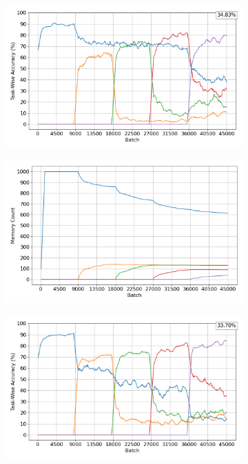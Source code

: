 \documentclass[oneside]{ctuthesis}
\begin{document}
\begin{figure}[t]
    \centering
    \begin{subfigure}[t]{0.48\linewidth}
        \centering
        \includegraphics[width=\linewidth]{figures/DISJOINT2_GSS1k_B1_accuracy.png}
        \label{fig:gss-cifar10-accuracy}
    \end{subfigure}
    \hfill
    \begin{subfigure}[t]{0.48\linewidth}
        \centering
        \includegraphics[width=\linewidth]{figures/DISJOINT2_GSS1k_B1_memory.png}
        \label{fig:gss-cifar10-fe-accuracy}
    \end{subfigure}
    \begin{subfigure}[t]{0.48\linewidth}
        \centering
        \includegraphics[width=\linewidth]{figures/DISJOINT2_GSS1k_B1_FORCED_EQUALITY_accuracy.png}

\end{subfigure}
\end{figure}
\end{document}
